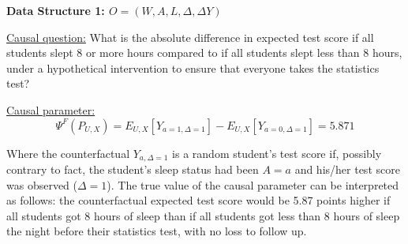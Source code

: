 \documentclass{exam}
\begin{document}
\pagebreak

\noindent\large\textbf{Data Structure 1: $O = (W, A, L, \Delta, \Delta Y)$}
\normalsize



\noindent \underline{Causal question:} What is the absolute difference in expected test score if all students slept 8 or more hours compared to if all students slept less than 8 hours, under a hypothetical intervention to ensure that everyone takes the statistics test?

\noindent \underline{Causal parameter:}
\[
\Psi^F(P_{U,X}) = E_{U,X}[Y_{a=1, \Delta=1}] - E_{U,X}[Y_{a=0, \Delta=1}] = 5.871
\]

Where the counterfactual $Y_{a,\Delta=1}$ is a random student's test score if, possibly contrary to fact, the student's sleep status had been $A=a$ and his/her test score was observed ($\Delta=1$). The true value of the causal parameter can be interpreted as follows: the counterfactual expected test score would be 5.87 points higher if all students got 8 hours of sleep than if all students got less than 8 hours of sleep the night before their statistics test, with no loss to follow up. 
\end{document}
